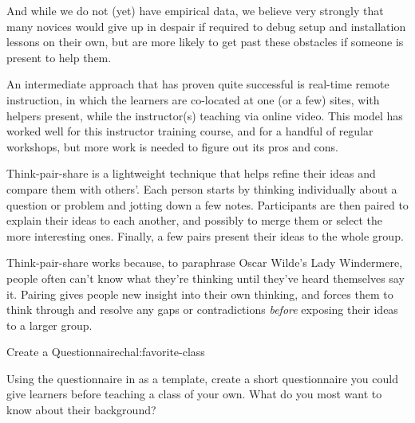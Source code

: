 And while we do not (yet) have empirical data, we believe very
strongly that many novices would give up in despair if required to
debug setup and installation lessons on their own, but are more likely
to get past these obstacles if someone is present to help them.

An intermediate approach that has proven quite successful is real-time
remote instruction, in which the learners are co-located at one (or a
few) sites, with helpers present, while the instructor(s) teaching via
online video. This model has worked well for this instructor training
course, and for a handful of regular workshops, but more work is
needed to figure out its pros and cons.


Think-pair-share is a lightweight technique that helps refine their
ideas and compare them with others'.  Each person starts by thinking
individually about a question or problem and jotting down a few notes.
Participants are then paired to explain their ideas to each another,
and possibly to merge them or select the more interesting ones.
Finally, a few pairs present their ideas to the whole group.

Think-pair-share works because, to paraphrase Oscar Wilde's Lady
Windermere, people often can't know what they're thinking until
they've heard themselves say it.  Pairing gives people new insight
into their own thinking, and forces them to think through and resolve
any gaps or contradictions \emph{before} exposing their ideas to a
larger group.


\begin{challenge}{Create a Questionnaire}{chal:favorite-class}

Using the questionnaire in  as a template,
create a short questionnaire you could give learners before teaching a
class of your own.  What do you most want to know about their
background?

\end{challenge}
